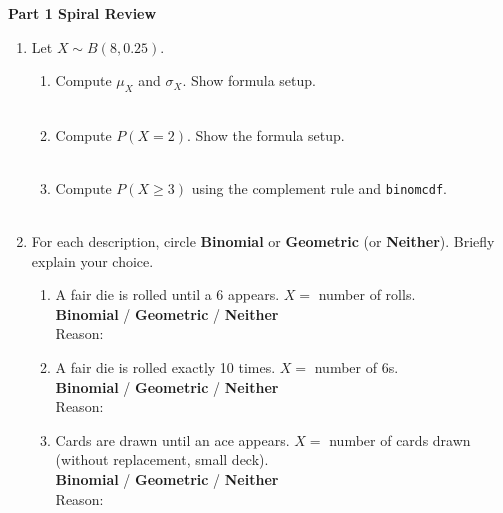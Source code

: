\documentclass[10pt]{article}
\begin{document}
\namedateperiod

\vspace{0.05in}

{\large\bfseries\color{navy} Part 1 \quad Spiral Review}

\vspace{0.05in}

\begin{enumerate}

    \item Let $X \sim B(8, 0.25)$.
    \begin{enumerate}[label=(\alph*), itemsep=2pt]
        \item Compute $\mu_X$ and $\sigma_X$. Show formula setup.\\
        \writeline\\[1pt]\writeline
        \item Compute $P(X = 2)$. Show the formula setup.\\
        \writeline\\[1pt]\writeline
        \item Compute $P(X \ge 3)$ using the complement rule and \texttt{binomcdf}.\\
        \writeline\\[1pt]\writeline
    \end{enumerate}

    \vspace{0.06in}

    \item For each description, circle \textbf{Binomial} or \textbf{Geometric} (or
    \textbf{Neither}). Briefly explain your choice.
    \begin{enumerate}[label=(\alph*), itemsep=2pt]
        \item A fair die is rolled until a 6 appears. $X =$ number of rolls.\\
              \textbf{Binomial} \quad / \quad \textbf{Geometric} \quad / \quad \textbf{Neither}\\
              Reason: \writeline
        \item A fair die is rolled exactly 10 times. $X =$ number of 6s.\\
              \textbf{Binomial} \quad / \quad \textbf{Geometric} \quad / \quad \textbf{Neither}\\
              Reason: \writeline
        \item Cards are drawn until an ace appears. $X =$ number of cards drawn
              (without replacement, small deck).\\
              \textbf{Binomial} \quad / \quad \textbf{Geometric} \quad / \quad \textbf{Neither}\\
              Reason: \writeline
    \end{enumerate}


\end{enumerate}
\end{document}
